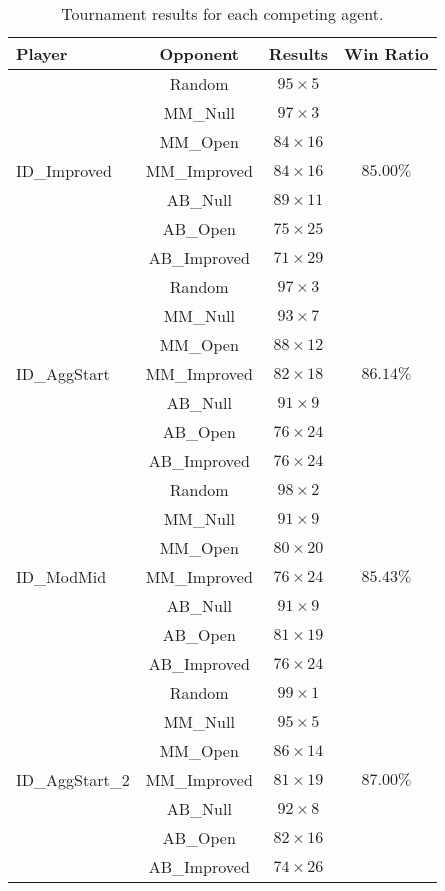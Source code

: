 \documentclass[12pt, a4paper]{article}
\begin{document}
	\begin{table}[h]
		\centering
		\caption{Tournament results for each competing agent.}
		\begin{tabular}{l|c|c|c}
			Player & Opponent & Results & Win Ratio \\
			\hline
			\multirow{7}{*}{ID{\_}Improved} & Random & $95 \times 5$ & \multirow{7}{*}{$85.00\%$}\\
			 & MM{\_}Null 		& $97 \times 3$ \\
			 & MM{\_}Open 		& $84 \times 16$ \\
			 & MM{\_}Improved 	& $84 \times 16$ \\
			 & AB{\_}Null 		& $89 \times 11$ \\
			 & AB{\_}Open 		& $75 \times 25$ \\
			 & AB{\_}Improved 	& $71 \times 29$ \\
			\hline
			\multirow{7}{*}{ID{\_}AggStart} & Random & $97 \times 3$ & \multirow{7}{*}{$86.14\%$}\\
			& MM{\_}Null 		& $93 \times 7$ \\
			& MM{\_}Open 		& $88 \times 12$ \\
			& MM{\_}Improved 	& $82 \times 18$ \\
			& AB{\_}Null 		& $91 \times 9$ \\
			& AB{\_}Open 		& $76 \times 24$ \\
			& AB{\_}Improved 	& $76 \times 24$ \\
			\hline
			\multirow{7}{*}{ID{\_}ModMid} & Random & $98 \times 2$ & \multirow{7}{*}{$85.43\%$}\\
			& MM{\_}Null 		& $91 \times 9$ \\
			& MM{\_}Open 		& $80 \times 20$ \\
			& MM{\_}Improved 	& $76 \times 24$ \\
			& AB{\_}Null 		& $91 \times 9$ \\
			& AB{\_}Open 		& $81 \times 19$ \\
			& AB{\_}Improved 	& $76 \times 24$ \\
			\hline
			\multirow{7}{*}{ID{\_}AggStart\_2} & Random & $99 \times 1$ & \multirow{7}{*}{$87.00\%$}\\
			& MM{\_}Null 		& $95 \times 5$ \\
			& MM{\_}Open 		& $86 \times 14$ \\
			& MM{\_}Improved 	& $81 \times 19$ \\
			& AB{\_}Null 		& $92 \times 8$ \\
			& AB{\_}Open 		& $82 \times 16$ \\
			& AB{\_}Improved 	& $74 \times 26$ \\
			\hline
		\end{tabular}
	\end{table}
\end{document}
